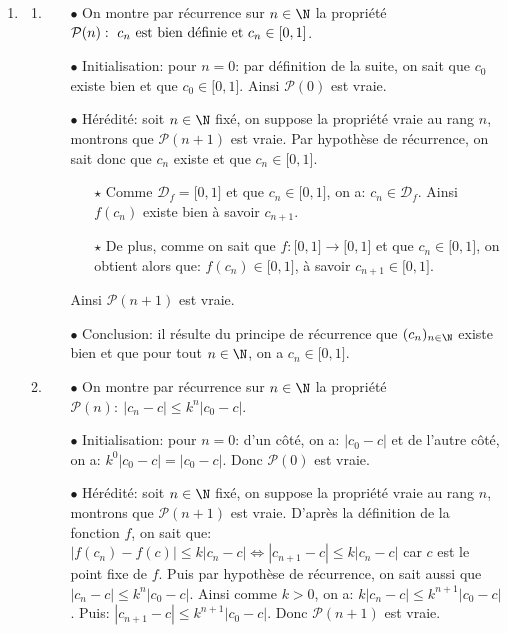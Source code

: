 \begin{correction}
\begin{enumerate}
\item
\begin{enumerate}
\item 
\begin{itemize}
\item[$\bullet$] On montre par r\'ecurrence sur $n\in\N$ la propri\'et\'e $\mathcal{P}(n):\ c_n\ \hbox{est bien d\'efinie et}\ c_n\in\lbrack 0,1\rbrack$. 
\item[$\bullet$] Initialisation: pour $n=0$: par d\'efinition de la suite, on sait que $c_0$ existe bien et que $c_0\in\lbrack 0,1\rbrack$. Ainsi $\mathcal{P}(0)$ est vraie. 
\item[$\bullet$] H\'er\'edit\'e: soit $n\in\N$ fix\'e, on suppose la propri\'et\'e vraie au rang $n$, montrons que $\mathcal{P}(n+1)$ est vraie. Par hypoth\`{e}se de r\'ecurrence, on sait donc que $c_n$ existe et que $c_n\in\lbrack 0,1\rbrack$.
\begin{itemize}
\item[$\star$] Comme $\mathcal{D}_f=\lbrack 0,1\rbrack$ et que $c_n\in\lbrack 0,1\rbrack$, on a: $c_n\in\mathcal{D}_f$. Ainsi $f(c_n)$ existe bien \`{a} savoir $c_{n+1}$.
\item[$\star$] De plus, comme on sait que $f: \lbrack 0,1\rbrack\rightarrow \lbrack 0,1\rbrack$ et que $c_n\in\lbrack 0,1\rbrack$, on obtient alors que: $f(c_n)\in\lbrack 0,1\rbrack$, \`{a} savoir $c_{n+1}\in\lbrack 0,1\rbrack$.
\end{itemize}
Ainsi $\mathcal{P}(n+1)$ est vraie.
\item[$\bullet$] Conclusion: il r\'esulte du principe de r\'ecurrence que $(c_n)_{n\in\N}$ existe bien et que pour tout $n\in\N$, on a $c_n\in\lbrack 0,1\rbrack$.
\end{itemize}
\item
\begin{itemize}
\item[$\bullet$] On montre par r\'ecurrence sur $n\in\N$ la propri\'et\'e $\mathcal{P}(n):\ |c_n-c|\leq k^n |c_0-c|$.
\item[$\bullet$] Initialisation: pour $n=0$: d'un c\^{o}t\'e, on a: $|c_0-c|$ et de l'autre c\^{o}t\'e, on a: $k^0|c_0-c|=|c_0-c|$. Donc $\mathcal{P}(0)$ est vraie.
\item[$\bullet$] H\'er\'edit\'e: soit $n\in\N$ fix\'e, on suppose la propri\'et\'e vraie au rang $n$, montrons que $\mathcal{P}(n+1)$ est vraie. D'apr\`{e}s la d\'efinition de la fonction $f$, on sait que: $|f(c_n)-f(c)|\leq k|c_n-c|\Leftrightarrow |c_{n+1}-c|\leq k|c_n-c|$ car $c$ est le point fixe de $f$. Puis par hypoth\`{e}se de r\'ecurrence, on sait aussi que $|c_n-c|\leq k^n |c_0-c|$. Ainsi comme $k>0$, on a: $k|c_n-c|\leq k^{n+1}|c_0-c|$. Puis: $|c_{n+1}-c|\leq k^{n+1}|c_0-c|$. Donc $\mathcal{P}(n+1)$ est vraie.

\end{itemize}
\end{enumerate}
\end{enumerate}
\end{correction}
